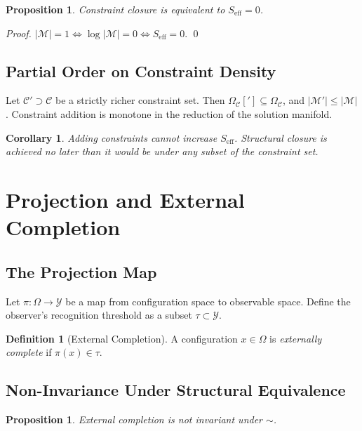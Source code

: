 \documentclass[11pt, twoside]{article}
\theoremstyle{plain}
\newtheorem{proposition}[theorem]{Proposition}
\newtheorem{corollary}[theorem]{Corollary}
\theoremstyle{definition}
\newtheorem{definition}[theorem]{Definition}
\theoremstyle{remark}
\newcommand{\OmC}{\Omega_{\mathcal{C}}}
\newcommand{\Seff}{S_{\text{eff}}}
\begin{document}
\begin{proposition}
Constraint closure is equivalent to $\Seff = 0$.
\end{proposition}

\begin{proof}
$|\mathcal{M}| = 1 \iff \log |\mathcal{M}| = 0 \iff \Seff = 0$. \qed
\end{proof}

\subsection{Partial Order on Constraint Density}

Let $\mathcal{C}' \supset \mathcal{C}$ be a strictly richer constraint set. Then $\OmC['] \subseteq \OmC$, and $|\mathcal{M}'| \leq |\mathcal{M}|$. Constraint addition is monotone in the reduction of the solution manifold.

\begin{corollary}
Adding constraints cannot increase $\Seff$. Structural closure is achieved no later than it would be under any subset of the constraint set.
\end{corollary}

\section{Projection and External Completion}
\label{app:projection}

\subsection{The Projection Map}

Let $\pi : \Omega \to \mathcal{Y}$ be a map from configuration space to observable space. Define the observer's recognition threshold as a subset $\tau \subset \mathcal{Y}$.

\begin{definition}[External Completion]
A configuration $x \in \Omega$ is \emph{externally complete} if $\pi(x) \in \tau$.
\end{definition}

\subsection{Non-Invariance Under Structural Equivalence}

\begin{proposition}
External completion is not invariant under $\sim$.
\end{proposition}
\end{document}
